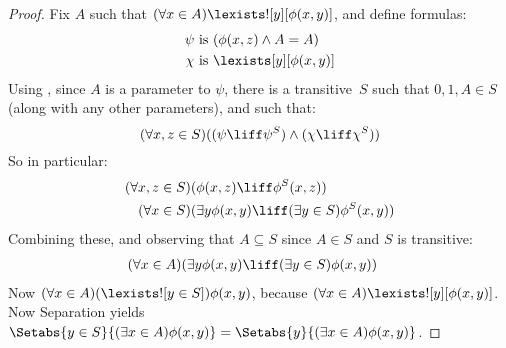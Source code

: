 \documentclass[../../../include/open-logic-section]{subfiles}
\begin{document}
\begin{proof}
Fix $A$ such that $(\forall x \in A)\lexists![y][\phi(x,y)]$, and
define formulas:
\begin{align*}
	\psi &\text{ is } (\phi(x, z) \land A = A)\\
	\chi &\text{ is } \lexists[y][\phi(x, y)]
\end{align*}
Using , since $A$ is a parameter to $\psi$, there
is a transitive~$S$ such that $0, 1, A \in S$  (along with any other
parameters), and such that:
\[
	(\forall x,z \in S)((\psi \liff \psi^S) \land (\chi \liff \chi^S))
\]
So in particular:
\begin{align*}
	(\forall  x, z \in S)(&\phi(x, z) \liff \phi^S(x, z))\\
	(\forall x \in S)(&\exists y\phi(x, y) \liff (\exists y \in S)\phi^S(x, y)) 
\end{align*}
Combining these, and observing that $A \subseteq S$ since $A \in S$ and $S$ is transitive:
\begin{align*}
	(\forall x \in A)(&\exists y\phi(x, y) \liff (\exists y \in S)\phi(x, y))
\end{align*}
Now $(\forall x \in A)(\lexists![y \in S])\phi(x, y)$, because
$(\forall x \in A)\lexists![y][\phi(x, y)]$. Now Separation yields
$\Setabs{y \in S}{(\exists x \in A) \phi(x, y)} = \Setabs{y}{(\exists
x \in A) \phi(x, y)}$. 
\end{proof}
\end{document}
